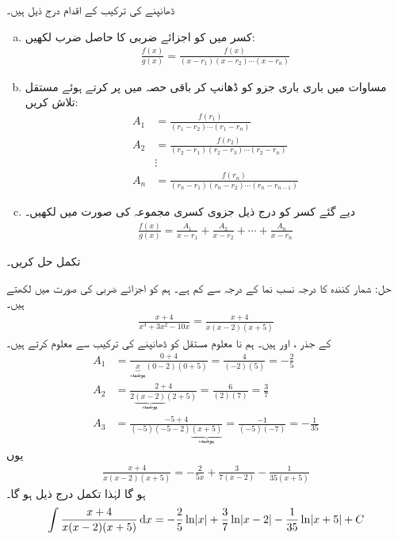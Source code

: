 ڈھانپنے کی ترکیب کے اقدام درج ذیل ہیں۔
\begin{enumerate}[a.]
\item
کسر میں  کو اجزائے ضربی کا حاصل ضرب لکھیں:
\begin{align}\label{مساوات_طریقہ_ڈھانپنے_کی_ترکیب_ب}
\frac{f(x)}{g(x)}=\frac{f(x)}{(x-r_1)(x-r_2)\cdots(x-r_n)}
\end{align}
\item
مساوات میں باری باری جزو  کو ڈھانپ کر باقی حصہ میں  پر کرتے ہوئے مستقل  تلاش کریں:
\begin{align*}
A_1&=\frac{f(r_1)}{(r_1-r_2)\cdots (r_1-r_n)}\\
A_2&=\frac{f(r_2)}{(r_2-r_1)(r_2-r_3)\cdots (r_2-r_n)}\\
&\vdots\\
A_n&=\frac{f(r_n)}{(r_n-r_1)(r_n-r_2)\cdots(r_n-r_{n-1})}
\end{align*}
\item
 دیے گئے کسر  کو درج ذیل جزوی کسری مجموعہ کی صورت میں لکھیں۔
\begin{align*}
\frac{f(x)}{g(x)}=\frac{A_1}{x-r_1}+\frac{A_2}{x-r_2}+\cdots+\frac{A_n}{x-r_n}
\end{align*}
\end{enumerate} 

تکمل  حل کریں۔

حل:\quad
شمار کنندہ  کا درجہ نسب نما  کے درجہ سے کم ہے۔ ہم  کو اجزائے ضربی کی صورت میں لکھتے ہیں۔
\begin{align*}
\frac{x+4}{x^3+3x^2-10x}=\frac{x+4}{x(x-2)(x+5)}
\end{align*}
 کے جذر ،  اور  ہیں۔ ہم نا معلوم مستقل کو ڈھانپنے کی ترکیب سے معلوم کرتے ہیں۔
\begin{align*}
A_1&=\frac{0+4}{\underbrace{\boxed{x}}_{\text{پوشیدہ}}(0-2)(0+5)}=\frac{4}{(-2)(5)}=-\frac{2}{5}\\
A_2&=\frac{2+4}{2\underbrace{\boxed{(x-2)}}_{\text{پوشیدہ}}(2+5)}=\frac{6}{(2)(7)}=\frac{3}{7}\\
A_3&=\frac{-5+4}{(-5)(-5-2)\underbrace{\boxed{(x+5)}}_{\text{پوشیدہ}}}=\frac{-1}{(-5)(-7)}=-\frac{1}{35}
\end{align*}
یوں 
\begin{align*}
\frac{x+4}{x(x-2)(x+5)}=-\frac{2}{5x}+\frac{3}{7(x-2)}-\frac{1}{35(x+5)}
\end{align*}
ہو گا لہٰذا تکمل درج ذیل ہو گا۔
\begin{align*}
\int\frac{x+4}{x(x-2)(x+5)}\dif x=-\frac{2}{5}\ln\abs{x}+\frac{3}{7}\ln\abs{x-2}-\frac{1}{35}\ln\abs{x+5}+C
\end{align*}


